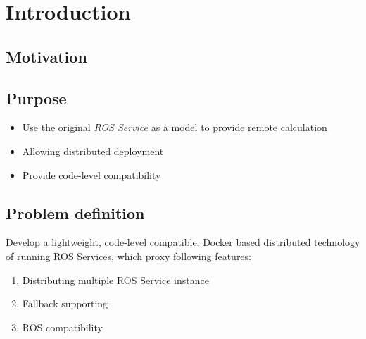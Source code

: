 \section{Introduction}

\subsection{Motivation}

\subsection{Purpose}

\begin{itemize}
    \item Use the original \emph{ROS Service} as a model to provide remote calculation
    \item Allowing distributed deployment
    \item Provide code-level compatibility
\end{itemize}

\subsection{Problem definition}

Develop a lightweight, code-level compatible, Docker based distributed technology of running ROS Services, which proxy following features:

\begin{enumerate}
    \item Distributing multiple ROS Service instance \label{feature:mul}
    \item Fallback supporting \label{feature:fallback}
    \item ROS compatibility \label{feature:comp}
\end{enumerate}




